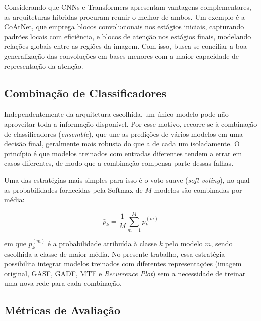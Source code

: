 Considerando que CNNs e Transformers apresentam vantagens complementares, as arquiteturas híbridas procuram reunir o melhor de ambos. Um exemplo é a CoAtNet, que emprega blocos convolucionais nos estágios iniciais, capturando padrões locais com eficiência, e blocos de atenção nos estágios finais, modelando relações globais entre as regiões da imagem. %
Com isso, busca-se conciliar a boa generalização das convoluções em bases menores com a maior capacidade de representação da atenção.

\subsection{Combinação de Classificadores}
\hspace{+15pt}

Independentemente da arquitetura escolhida, um único modelo pode não aproveitar toda a informação disponível. Por esse motivo, recorre-se à combinação de classificadores (\textit{ensemble}), que une as predições de vários modelos em uma decisão final, geralmente mais robusta do que a de cada um isoladamente. O princípio é que modelos treinados com entradas diferentes tendem a errar em casos diferentes, de modo que a combinação compensa parte dessas falhas. %

Uma das estratégias mais simples para isso é o voto suave (\textit{soft voting}), no qual as probabilidades fornecidas pela Softmax de $M$ modelos são combinadas por média:

\begin{equation}
\bar{p}_k = \frac{1}{M} \sum_{m=1}^{M} p_k^{(m)}
\end{equation}

\noindent em que $p_k^{(m)}$ é a probabilidade atribuída à classe $k$ pelo modelo $m$, sendo escolhida a classe de maior média. No presente trabalho, essa estratégia possibilita integrar modelos treinados com diferentes representações (imagem original, GASF, GADF, MTF e \textit{Recurrence Plot}) sem a necessidade de treinar uma nova rede para cada combinação.

\subsection{Métricas de Avaliação}
\hspace{+15pt}

